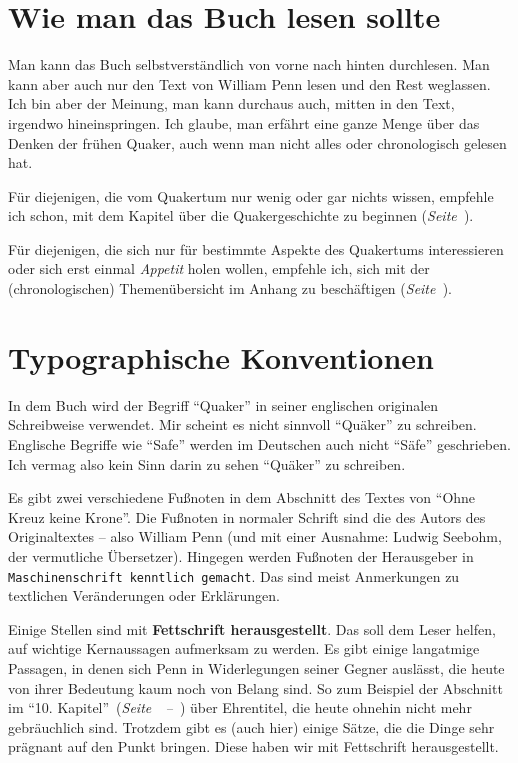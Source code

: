 \chapter{Wie man das Buch lesen sollte}

Man kann das Buch selbstverständlich von vorne nach hinten durchlesen. Man kann aber auch nur den Text
von William Penn lesen und den Rest weglassen. Ich bin aber der Meinung, man kann
durchaus auch, mitten in den Text, irgendwo hineinspringen. Ich glaube, man
erfährt eine ganze Menge über das Denken der frühen Quaker, auch wenn man nicht
alles oder chronologisch gelesen hat.

\medskip

Für diejenigen, die vom Quakertum nur wenig oder gar nichts wissen, empfehle ich
 schon, mit dem Kapitel über die Quakergeschichte zu beginnen
 (\textit{Seite~\pageref{ref:entwicklung_quakertum}}).

\medskip

Für diejenigen, die sich nur für bestimmte Aspekte des Quakertums interessieren oder
sich erst einmal \textit{Appetit} holen wollen, empfehle ich, sich mit der
(chronologischen) Themenübersicht im Anhang zu beschäftigen
(\textit{Seite~\pageref{ref:theme_nuebersicht}}).

\chapter{Typographische Konventionen}

In dem Buch wird der Begriff "`Quaker"'  in seiner
englischen originalen Schreibweise verwendet. Mir scheint es nicht sinnvoll
"`Quäker"' zu schreiben. Englische Begriffe wie "`Safe"' werden im Deutschen
auch nicht "`Säfe"' geschrieben. Ich vermag also kein Sinn darin zu sehen
"`Quäker"' zu schreiben.

\medskip

Es gibt zwei verschiedene Fußnoten in dem Abschnitt des Textes von "`Ohne Kreuz
keine Krone"'. Die Fußnoten in normaler Schrift sind die des Autors des
Originaltextes -- also William Penn (und mit einer Ausnahme: Ludwig Seebohm, der vermutliche Übersetzer).
Hingegen werden Fußnoten der Herausgeber in
\texttt{Maschinenschrift kenntlich gemacht}. Das sind meist Anmerkungen zu
textlichen Veränderungen oder Erklärungen.

\medskip

Einige Stellen sind mit \textbf{Fettschrift herausgestellt}. Das soll dem Leser
helfen, auf wichtige Kernaussagen aufmerksam zu werden. Es gibt einige langatmige
Passagen, in denen sich Penn in Widerlegungen seiner Gegner auslässt, die
heute von ihrer Bedeutung kaum noch von Belang sind. So zum Beispiel der Abschnitt im
"`10. Kapitel"'~(\textit{Seite~\pageref{kap10}~--~\pageref{kap10_ende}}) über
Ehrentitel, die heute ohnehin nicht mehr gebräuchlich sind. Trotzdem gibt es
(auch hier) einige Sätze, die die Dinge sehr prägnant auf den Punkt bringen.
Diese haben wir mit Fettschrift herausgestellt.

